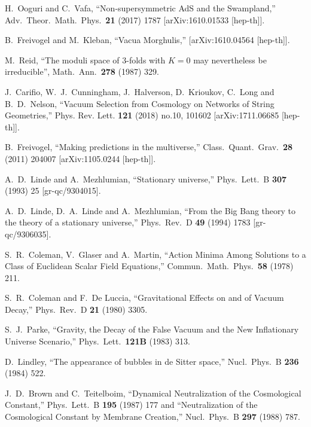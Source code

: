 \documentclass[12pt]{article}
\numberwithin{equation}{section}
\begin{document}
\begin{thebibliography}{999}
  H.~Ooguri and C.~Vafa, ``Non-supersymmetric AdS and the Swampland,''
  Adv.\ Theor.\ Math.\ Phys.\  {\bf 21} (2017) 1787
  [arXiv:1610.01533 [hep-th]].

B.~Freivogel and M.~Kleban, ``Vacua Morghulis,''
[arXiv:1610.04564 [hep-th]].

M.~Reid, ``The moduli space of 3-folds with $K = 0$ may nevertheless be irreducible'', Math.\ Ann.\ {\bf278} (1987) 329.

J.~Carifio, W.~J.~Cunningham, J.~Halverson, D.~Krioukov, C.~Long and B.~D.~Nelson,
``Vacuum Selection from Cosmology on Networks of String Geometries,''
Phys. Rev. Lett. \textbf{121} (2018) no.10, 101602
[arXiv:1711.06685 [hep-th]].

  B.~Freivogel,
  ``Making predictions in the multiverse,''
  Class.\ Quant.\ Grav.\  {\bf 28} (2011) 204007
  [arXiv:1105.0244 [hep-th]].

  A.~D.~Linde and A.~Mezhlumian,
  ``Stationary universe,''
  Phys.\ Lett.\ B {\bf 307} (1993) 25
  [gr-qc/9304015].
  
  A.~D.~Linde, D.~A.~Linde and A.~Mezhlumian,
  ``From the Big Bang theory to the theory of a stationary universe,''
  Phys.\ Rev.\ D {\bf 49} (1994) 1783
  [gr-qc/9306035].
    
  S.~R.~Coleman, V.~Glaser and A.~Martin,
  ``Action Minima Among Solutions to a Class of Euclidean Scalar Field Equations,''
  Commun.\ Math.\ Phys.\  {\bf 58} (1978) 211.

  S.~R.~Coleman and F.~De Luccia,
  ``Gravitational Effects on and of Vacuum Decay,''
  Phys.\ Rev.\ D {\bf 21} (1980) 3305.
 
  S.~J.~Parke,
  ``Gravity, the Decay of the False Vacuum and the New Inflationary Universe Scenario,''
  Phys.\ Lett.\  {\bf 121B} (1983) 313.
 
  D.~Lindley,
  ``The appearance of bubbles in de Sitter space,''
  Nucl.\ Phys.\ B {\bf 236} (1984) 522.

  J.~D.~Brown and C.~Teitelboim,
  ``Dynamical Neutralization of the Cosmological Constant,''
  Phys.\ Lett.\ B {\bf 195} (1987) 177
and 
  ``Neutralization of the Cosmological Constant by Membrane Creation,''
  Nucl.\ Phys.\ B {\bf 297} (1988) 787.
  

\end{thebibliography}
\end{document}
